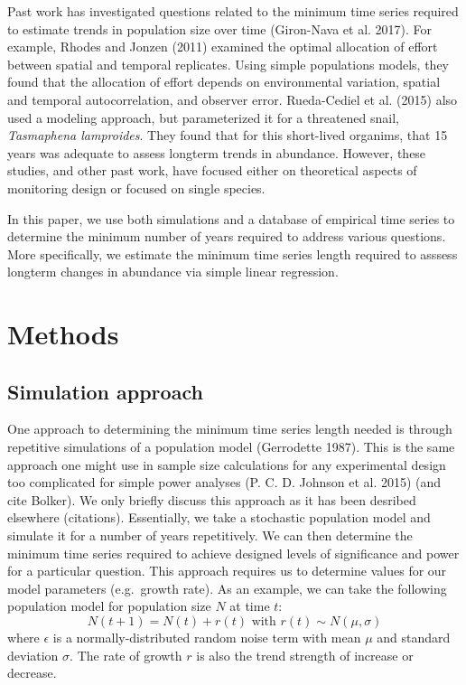\documentclass[12pt,]{article}
\begin{document}
Past work has investigated questions related to the minimum time series
required to estimate trends in population size over time (Giron-Nava et
al. 2017). For example, Rhodes and Jonzen (2011) examined the optimal
allocation of effort between spatial and temporal replicates. Using
simple populations models, they found that the allocation of effort
depends on environmental variation, spatial and temporal
autocorrelation, and observer error. Rueda-Cediel et al. (2015) also
used a modeling approach, but parameterized it for a threatened snail,
\emph{Tasmaphena lamproides}. They found that for this short-lived
organims, that 15 years was adequate to assess longterm trends in
abundance. However, these studies, and other past work, have focused
either on theoretical aspects of monitoring design or focused on single
species.

In this paper, we use both simulations and a database of empirical time
series to determine the minimum number of years required to address
various questions. More specifically, we estimate the minimum time
series length required to asssess longterm changes in abundance via
simple linear regression.

\section{Methods}\label{methods}

\subsection{Simulation approach}\label{simulation-approach}

One approach to determining the minimum time series length needed is
through repetitive simulations of a population model (Gerrodette 1987).
This is the same approach one might use in sample size calculations for
any experimental design too complicated for simple power analyses (P. C.
D. Johnson et al. 2015) (and cite Bolker). We only briefly discuss this
approach as it has been desribed elsewhere (citations). Essentially, we
take a stochastic population model and simulate it for a number of years
repetitively. We can then determine the minimum time series required to
achieve designed levels of significance and power for a particular
question. This approach requires us to determine values for our model
parameters (e.g.~growth rate). As an example, we can take the following
population model for population size \(N\) at time \(t\): \[
N(t + 1) = N(t) + r(t) \mbox{ with } r(t) \sim N(\mu, \sigma)
\] where \(\epsilon\) is a normally-distributed random noise term with
mean \(\mu\) and standard deviation \(\sigma\). The rate of growth \(r\)
is also the trend strength of increase or decrease.
\end{document}
